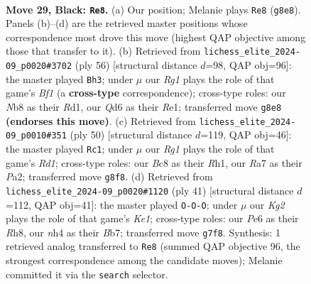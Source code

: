 \documentclass[11pt]{article}
\begin{document}
\clearpage

\begin{figure}[p]\centering
\begin{subfigure}{0.46\textwidth}\centering
\resizebox{\linewidth}{!}{%
\newchessgame
\chessboard[
  setfen={1nb3r1/rp4k1/2pqp3/p2p1p1p/Pn1P1P1N/2N3P1/1PPQ2KP/3R1B1R b - - 12 29},
  showmover=false,
  pgfstyle=straightmove, color=movearrow, markmove={g8-e8}
]}
\caption{}
\end{subfigure}\hfill
\begin{subfigure}{0.46\textwidth}\centering
\resizebox{\linewidth}{!}{%
\newchessgame
\chessboard[
  setfen={3r4/3r2k1/1pq2pp1/p1pnpn1p/4N2P/2PP2P1/1PQ2P2/3RRBK1 w - - 2 29},
  showmover=false,
  pgfstyle=straightmove, color=movearrow, markmove={f1-h3}
]}
\caption{}
\end{subfigure}
\\[4pt]
\begin{subfigure}{0.46\textwidth}\centering
\resizebox{\linewidth}{!}{%
\newchessgame
\chessboard[
  setfen={1kr3r1/pp1q4/2n1n3/3p1p1p/3Pp1pP/2P1B1P1/PPNQ1P2/1K1R3R w - - 4 26},
  showmover=false,
  pgfstyle=straightmove, color=movearrow, markmove={d1-c1}
]}
\caption{}
\end{subfigure}\hfill
\begin{subfigure}{0.46\textwidth}\centering
\resizebox{\linewidth}{!}{%
\newchessgame
\chessboard[
  setfen={r3k2r/1bqnppb1/pp1p3p/2pP4/P1P1PP2/2N1B1NP/1P1Q2K1/R3R3 b kq - 0 21},
  showmover=false,
  pgfstyle=straightmove, color=movearrow, markmove={e8-c8}
]}
\caption{}
\end{subfigure}
\caption{\textbf{Move 29, Black: \texttt{Re8}.} (a) Our position; Melanie plays \texttt{Re8} (\texttt{g8e8}). Panels (b)--(d) are the retrieved master positions whose correspondence most drove this move (highest QAP objective among those that transfer to it). (b) Retrieved from \texttt{lichess\_elite\_2024-09\_p0020\#3702} (ply 56) [structural distance $d$=98, QAP obj=96]: the master played \texttt{Bh3}; under $\mu$ our \emph{Rg1} plays the role of that game's \emph{Bf1} (a \textbf{cross-type} correspondence); cross-type roles: our \emph{N}b8 as their \emph{R}d1, our \emph{Q}d6 as their \emph{R}e1; transferred move \texttt{g8e8} \textbf{(endorses this move)}. (c) Retrieved from \texttt{lichess\_elite\_2024-09\_p0010\#351} (ply 50) [structural distance $d$=119, QAP obj=46]: the master played \texttt{Rc1}; under $\mu$ our \emph{Rg1} plays the role of that game's \emph{Rd1}; cross-type roles: our \emph{B}c8 as their \emph{R}h1, our \emph{R}a7 as their \emph{P}a2; transferred move \texttt{g8f8}. (d) Retrieved from \texttt{lichess\_elite\_2024-09\_p0020\#1120} (ply 41) [structural distance $d$=112, QAP obj=41]: the master played \texttt{O-O-O}; under $\mu$ our \emph{Kg2} plays the role of that game's \emph{Ke1}; cross-type roles: our \emph{P}e6 as their \emph{R}h8, our \emph{n}h4 as their \emph{B}b7; transferred move \texttt{g7f8}. Synthesis: 1 retrieved analog transferred to \texttt{Re8} (summed QAP objective 96, the strongest correspondence among the candidate moves); Melanie committed it via the \texttt{search} selector.}
\label{fig:thought-m57}
\end{figure}
\end{document}
